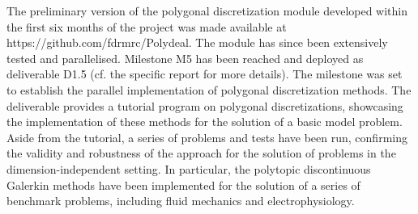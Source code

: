 \documentclass[a4paper,12pt]{article}
\begin{document}
The preliminary version of the polygonal discretization module developed within the first six months of the project was made available at https://github.com/fdrmrc/Polydeal.
The module has since been extensively tested and parallelised. 
Milestone M5 has been reached and deployed as deliverable D1.5 (cf. the specific report for more details). The milestone was set to establish the parallel implementation of polygonal discretization methods. The deliverable provides a tutorial program on polygonal discretizations, showcasing the implementation of these methods for the solution of a basic model problem. Aside from the tutorial, a series of problems and tests have been run, confirming the validity and robustness of the approach for the solution of problems in the dimension-independent setting. In particular, the polytopic discontinuous Galerkin methods have been implemented for the solution of a series of benchmark problems, including fluid mechanics and electrophysiology.
\end{document}
